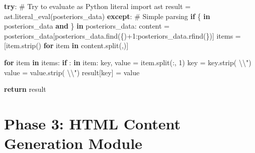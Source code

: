 \documentclass[
  11pt,
  letterpaper,
]{book}
\newenvironment{Shaded}{\begin{snugshade}}{\end{snugshade}}
\newcommand{\CharTok}[1]{\textcolor[rgb]{0.13,0.47,0.30}{#1}}
\newcommand{\CommentTok}[1]{\textcolor[rgb]{0.37,0.37,0.37}{#1}}
\newcommand{\ControlFlowTok}[1]{\textcolor[rgb]{0.00,0.23,0.31}{\textbf{#1}}}
\newcommand{\DecValTok}[1]{\textcolor[rgb]{0.68,0.00,0.00}{#1}}
\newcommand{\ImportTok}[1]{\textcolor[rgb]{0.00,0.46,0.62}{#1}}
\newcommand{\KeywordTok}[1]{\textcolor[rgb]{0.00,0.23,0.31}{\textbf{#1}}}
\newcommand{\NormalTok}[1]{\textcolor[rgb]{0.00,0.23,0.31}{#1}}
\newcommand{\OperatorTok}[1]{\textcolor[rgb]{0.37,0.37,0.37}{#1}}
\newcommand{\StringTok}[1]{\textcolor[rgb]{0.13,0.47,0.30}{#1}}
\begin{document}
\begin{Shaded}
\begin{Highlighting}[]
        \ControlFlowTok{try}\NormalTok{:}
            \CommentTok{\# Try to evaluate as Python literal}
            \ImportTok{import}\NormalTok{ ast}
\NormalTok{            result }\OperatorTok{=}\NormalTok{ ast.literal\_eval(posteriors\_data)}
        \ControlFlowTok{except}\NormalTok{:}
            \CommentTok{\# Simple parsing}
            \ControlFlowTok{if} \StringTok{\textquotesingle{}\{\textquotesingle{}} \KeywordTok{in}\NormalTok{ posteriors\_data }\KeywordTok{and} \StringTok{\textquotesingle{}\}\textquotesingle{}} \KeywordTok{in}\NormalTok{ posteriors\_data:}
\NormalTok{                content }\OperatorTok{=}\NormalTok{ posteriors\_data[posteriors\_data.find(}\StringTok{\textquotesingle{}\{\textquotesingle{}}\NormalTok{)}\OperatorTok{+}\DecValTok{1}\NormalTok{:posteriors\_data.rfind(}\StringTok{\textquotesingle{}\}\textquotesingle{}}\NormalTok{)]}
\NormalTok{                items }\OperatorTok{=}\NormalTok{ [item.strip() }\ControlFlowTok{for}\NormalTok{ item }\KeywordTok{in}\NormalTok{ content.split(}\StringTok{\textquotesingle{},\textquotesingle{}}\NormalTok{)]}

                \ControlFlowTok{for}\NormalTok{ item }\KeywordTok{in}\NormalTok{ items:}
                    \ControlFlowTok{if} \StringTok{\textquotesingle{}:\textquotesingle{}} \KeywordTok{in}\NormalTok{ item:}
\NormalTok{                        key, value }\OperatorTok{=}\NormalTok{ item.split(}\StringTok{\textquotesingle{}:\textquotesingle{}}\NormalTok{, }\DecValTok{1}\NormalTok{)}
\NormalTok{                        key }\OperatorTok{=}\NormalTok{ key.strip(}\StringTok{\textquotesingle{} }\CharTok{\textbackslash{}\textquotesingle{}\textbackslash{}"}\StringTok{\textquotesingle{}}\NormalTok{)}
\NormalTok{                        value }\OperatorTok{=}\NormalTok{ value.strip(}\StringTok{\textquotesingle{} }\CharTok{\textbackslash{}\textquotesingle{}\textbackslash{}"}\StringTok{\textquotesingle{}}\NormalTok{)}
\NormalTok{                        result[key] }\OperatorTok{=}\NormalTok{ value}

    \ControlFlowTok{return}\NormalTok{ result}
\end{Highlighting}
\end{Shaded}

\section{Phase 3: HTML Content Generation
Module}\label{phase-3-html-content-generation-module}
\end{document}
